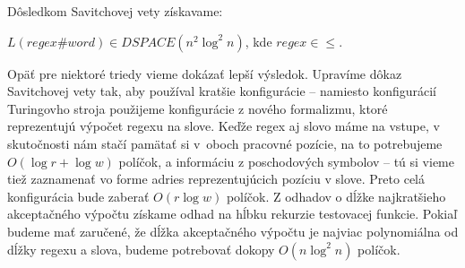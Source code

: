 Dôsledkom Savitchovej vety získavame:
\begin{veta}
$L(regex\#word) \in DSPACE(n^2 \log^2 n)$, kde $regex \in \le$. 
\end{veta}

Opäť pre niektoré triedy vieme dokázať lepší výsledok. Upravíme dôkaz Savitchovej vety tak, aby používal kratšie konfigurácie -- namiesto konfigurácií Turingovho stroja použijeme konfigurácie z nového formalizmu, ktoré reprezentujú výpočet regexu na slove. Keďže regex aj slovo máme na vstupe, v skutočnosti nám stačí pamätať si v~oboch pracovné pozície, na to potrebujeme $O(\log r + \log w)$ políčok, a informáciu z poschodových symbolov -- tú si vieme tiež zaznamenať vo forme adries reprezentujúcich pozíciu v slove. Preto celá konfigurácia bude zaberať $O(r\log w)$ políčok. Z odhadov o dĺžke naj\-krat\-šie\-ho akceptačného výpočtu získame odhad na hĺbku rekurzie testovacej funkcie. Pokiaľ budeme mať zaručené, že dĺžka akceptačného výpočtu je najviac polynomiálna od dĺžky regexu a slova, budeme potrebovať dokopy $O(n\log^2 n)$ políčok.

